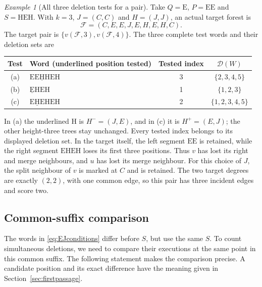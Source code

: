 \documentclass[11pt,a4paper]{article}
\theoremstyle{definition}
\theoremstyle{remark}
\newtheorem{example}{Example}[section]
\newcommand{\E}{\mathrm E}
\newcommand{\HH}{\mathrm H}
\begin{document}
\begin{example}[All three deletion tests for a pair]\label{ex:pair}
Take $Q=\E$, $P=\E\E$ and $S=\HH\E\HH$. With $k=3$, $J=(C,C)$ and $H=(J,J)$, an actual target forest is
\[
\mathcal F=(C,E,E,J,E,H,E,H,C).
\]
The target pair is $\{v(\mathcal F,3),v(\mathcal F,4)\}$. The three complete test words and their deletion sets are
\begin{center}
\begin{tabular}{clcc}
\toprule
Test&Word (underlined position tested)&Tested index&$\mathcal D(W)$\\
\midrule
(a)&$\E\E\underline{\HH}\HH\E\HH$&3&$\{2,3,4,5\}$\\
(b)&$\underline{\E}\HH\E\HH$&1&$\{1,2,3\}$\\
(c)&$\E\underline{\HH}\E\HH\E\HH$&2&$\{1,2,3,4,5\}$\\
\bottomrule
\end{tabular}
\end{center}
In (a) the underlined $\HH$ is $H^-=(J,E)$, and in (c) it is $H^+=(E,J)$; the other height-three trees stay unchanged. Every tested index belongs to its displayed deletion set. In the target itself, the left segment $\E\E$ is retained, while the right segment $\E\HH\E\HH$ loses its first three positions. Thus $v$ has lost its right and merge neighbours, and $u$ has lost its merge neighbour. For this choice of $J$, the split neighbour of $v$ is marked at $C$ and is retained. The two target degrees are exactly $(2,2)$, with one common edge, so this pair has three incident edges and score two.
\end{example}

\subsection{Common-suffix comparison}\label{sec:common-suffix}
The words in \eqref{eq:EJconditions} differ before $S$, but use the same $S$. To count simultaneous deletions, we need to compare their executions at the same point in this common suffix. The following statement makes the comparison precise. A candidate position and its exact difference have the meaning given in Section~\ref{sec:firstpassage}.
\end{document}
